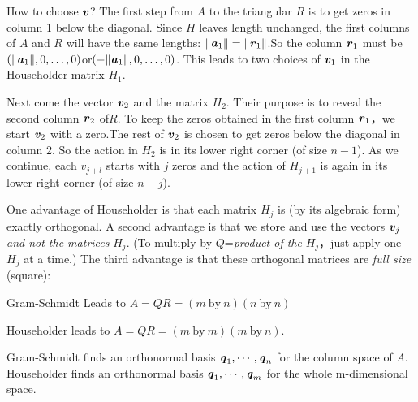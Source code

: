 How to choose $\textbf{\textit{v}}$? The first step from $A$ to the triangular $R$ is to get zeros in column 1 below the diagonal. Since $H$ leaves length unchanged, the first columns of $A$ and $R$ will have the same lengths: $ \lVert\textbf{\textit{a}}_{1}\rVert=\lVert\textbf{\textit{r}}_{1}\rVert$.So the column $\textbf{\textit{r}}_{1}$ must be $ (\lVert\textbf{\textit{a}}_{1}\rVert,0,\ldots,0)$or$ (-\lVert\textbf{\textit{a}}_{1}\rVert,0,\ldots,0)$. This leads to two choices of $\textbf{\textit{v}}_{1}$ in the Householder matrix $H_{1}$.

Next come the vector $\textbf{\textit{v}}_{2}$ and the matrix $H_{2}$. Their purpose is to reveal the second column $\textbf{\textit{r}}_{2}$ of$ R$. To keep the zeros obtained in the first column $\textbf{\textit{r}}_{1}$，we start $\textbf{\textit{v}}_{2}$ with a zero.The rest of $\textbf{\textit{v}}_{2}$ is chosen to get zeros below the diagonal in column 2. So the action in $H_{2}$ is in its lower right corner (of size $n-1$). As we continue, each $v_{j+l}$ starts with $j$ zeros and the action of $H_{j+1}$ is again in its lower right corner (of size $n-j$).

One advantage of Householder is that each matrix $H_{j}$ is (by its algebraic form) exactly orthogonal. A second advantage is that we store and use the vectors $\textbf{\textit{v}}_{j}$ \textit{and not the matrices} $H_{j}$. (To multiply by $Q$=\textit{product of the} $H_{j}$，just apply one $H_{j}$ at a time.) The third advantage is that these orthogonal matrices are \textit{full size} (square):
\begin{center}
	Gram-Schmidt Leads to $A=QR=(m \  \text{by} \  n)(n \  \text{by}  \ n)$
\end{center}
\begin{center}
	Householder leads to $A=QR=(m \  \text{by} \  m)(m \  \text{by} \  n)$.
\end{center}
\begin{flushleft}
	Gram-Schmidt finds an orthonormal basis $\textbf{\textit{q}}_{1},\cdots,\textbf{\textit{q}}_{n}$ for the column space of $A$. Householder finds an orthonormal basis $\textbf{\textit{q}}_{1},\cdots,\textbf{\textit{q}}_{m}$  for the whole m-dimensional space.
\end{flushleft}

